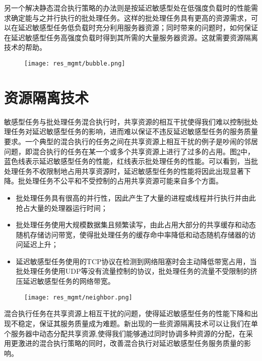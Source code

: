 另一个解决静态混合执行策略的办法则是按延迟敏感型处在低强度负载时的性能需求确定能与之并行执行的批处理任务。这样的批处理任务具有更高的资源需求，可以在延迟敏感型任务低负载时充分利用服务器资源；同时带来的问题时，如何保证在延迟敏感型任务高强度负载时得到其所需的大量服务器资源。这就需要资源隔离技术的帮助。
\begin{figure}[!t]
  \centering
    \texttt{[image: res\_mgmt/bubble.png]}
    \label{fig:bubble}    
\end{figure}
\section{资源隔离技术}
敏感型任务与批处理任务混合执行时，共享资源的相互干扰使得我们难以控制批处理任务对延迟敏感型任务的影响，进而难以保证不违反延迟敏感型任务的服务质量要求。一个典型的混合执行的任务之间在共享资源上相互干扰的例子是吵闹的邻居问题\cite{verboven2013black}，即混合执行的任务在某一个或多个共享资源上进行了过多的占用。图\ref{fig:neigbor}中，蓝色线表示延迟敏感型任务的性能，红线表示批处理任务的性能。可以看到，当批处理任务不收限制地占用共享资源时，延迟敏感型任务的性能将因此出现显著下降。批处理任务不公平和不受控制的占用共享资源可能来自多个方面。

\begin{itemize}
  \item 批处理任务具有很高的并行性，因此产生了大量的进程或线程并行执行并由此抢占大量的处理器运行时间；
  \item 批处理任务使用大规模数据集且频繁读写，由此占用大部分的共享缓存和动态随机存储访问带宽，使得批处理任务的缓存命中率降低和动态随机存储器的访问延迟上升；
  \item 延迟敏感型任务使用的TCP协议在检测到网络阻塞时会主动降低带宽占用，当批处理任务使用UDP等没有流量控制的协议，批处理任务的流量不受限制的挤压延迟敏感型任务的网络带宽。
\end{itemize}

\begin{figure}
  \centering
    \centering
    \texttt{[image: res\_mgmt/neighbor.png]}
    \label{fig:neigbor}  
\end{figure}


混合执行任务在共享资源上相互干扰的问题，使得延迟敏感型任务的性能下降和出现不稳定，保证其服务质量成为难题。新出现的一些资源隔离技术可以让我们在单个服务器中动态分配共享资源,使得我们能够通过同时协调多种资源的分配，在采用更激进的混合执行策略的同时，改善混合执行对延迟敏感型任务服务质量的影响。

